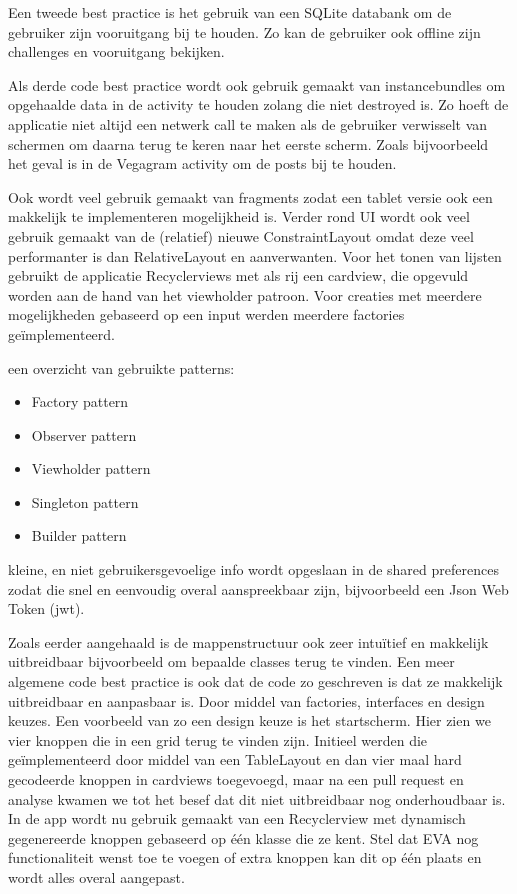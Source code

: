 Een tweede best practice is het gebruik van een SQLite databank om de gebruiker zijn vooruitgang bij te houden. Zo kan de gebruiker ook offline zijn challenges en vooruitgang bekijken.

Als derde code best practice wordt ook gebruik gemaakt van instancebundles om opgehaalde data in de activity te houden zolang die niet destroyed is. Zo hoeft de applicatie niet altijd een netwerk call te maken als de gebruiker verwisselt van schermen om daarna terug te keren naar het eerste scherm. Zoals bijvoorbeeld het geval is in de Vegagram activity om de posts bij te houden.

Ook wordt veel gebruik gemaakt van fragments zodat een tablet versie ook een makkelijk te implementeren mogelijkheid is. Verder rond UI wordt ook veel gebruik gemaakt van de (relatief) nieuwe ConstraintLayout omdat deze veel performanter is dan RelativeLayout en aanverwanten. Voor het tonen van lijsten gebruikt de applicatie Recyclerviews met als rij een cardview, die opgevuld worden aan de hand van het viewholder patroon. Voor creaties met meerdere mogelijkheden gebaseerd op een input werden meerdere factories geïmplementeerd.

een overzicht van gebruikte patterns:
\begin{itemize}
	\item Factory pattern
	\item Observer pattern
	\item Viewholder pattern
	\item Singleton pattern
	\item Builder pattern
\end{itemize}

kleine, en niet gebruikersgevoelige info wordt opgeslaan in de shared preferences zodat die snel en eenvoudig overal aanspreekbaar zijn, bijvoorbeeld een Json Web Token (jwt). 

Zoals eerder aangehaald is de mappenstructuur ook zeer intuïtief en makkelijk uitbreidbaar bijvoorbeeld om bepaalde classes terug te vinden. Een meer algemene code best practice is ook dat de code zo geschreven is dat ze makkelijk uitbreidbaar en aanpasbaar is. Door middel van factories, interfaces en design keuzes. Een voorbeeld van zo een design keuze is het startscherm. Hier zien we vier knoppen die in een grid terug te vinden zijn. Initieel werden die geïmplementeerd door middel van een TableLayout en dan vier maal hard gecodeerde knoppen in cardviews toegevoegd, maar na een pull request en analyse kwamen we tot het besef dat dit niet uitbreidbaar nog onderhoudbaar is. In de app wordt nu gebruik gemaakt van een Recyclerview met dynamisch gegenereerde knoppen gebaseerd op één klasse die ze kent. Stel dat EVA nog functionaliteit wenst toe te voegen of extra knoppen kan dit op één plaats en wordt alles overal aangepast.


